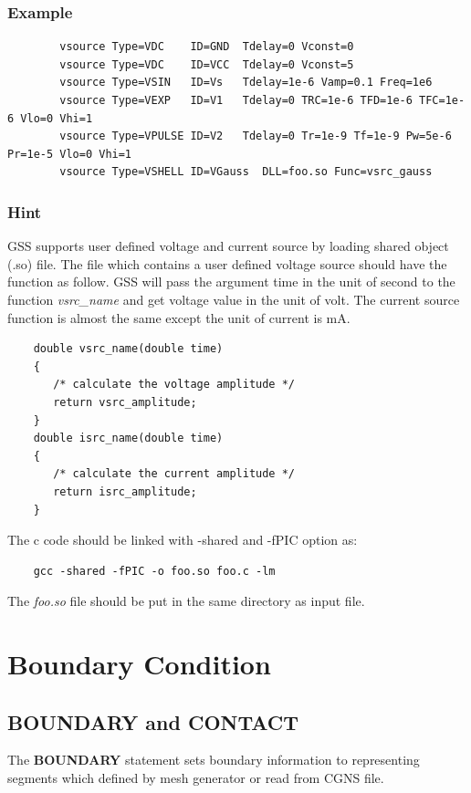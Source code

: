 \documentclass[11pt,pdftex]{article}
\begin{document}
\subsubsection*{Example}
\begin{verbatim}
        vsource Type=VDC    ID=GND  Tdelay=0 Vconst=0
        vsource Type=VDC    ID=VCC  Tdelay=0 Vconst=5
        vsource Type=VSIN   ID=Vs   Tdelay=1e-6 Vamp=0.1 Freq=1e6
        vsource Type=VEXP   ID=V1   Tdelay=0 TRC=1e-6 TFD=1e-6 TFC=1e-6 Vlo=0 Vhi=1
        vsource Type=VPULSE ID=V2   Tdelay=0 Tr=1e-9 Tf=1e-9 Pw=5e-6 Pr=1e-5 Vlo=0 Vhi=1
        vsource Type=VSHELL ID=VGauss  DLL=foo.so Func=vsrc_gauss
\end{verbatim}

\newpage
\subsubsection*{Hint}
GSS supports user defined voltage and current source by loading
shared object (.so) file. The file which contains a user defined
voltage source should have the function as follow. GSS will pass the
argument time in the unit of second to the function
\textit{vsrc\_name} and get voltage value in the unit of volt. The
current source function is almost the same except the unit of
current is $\mathrm{mA}$.

\begin{verbatim}
    double vsrc_name(double time)
    {
       /* calculate the voltage amplitude */
       return vsrc_amplitude;
    }
    double isrc_name(double time)
    {
       /* calculate the current amplitude */
       return isrc_amplitude;
    }
\end{verbatim}

The c code should be linked with -shared and -fPIC option as:
\begin{verbatim}
    gcc -shared -fPIC -o foo.so foo.c -lm
\end{verbatim}

The \textit{foo.so} file should be put in the same directory as
input file.

\newpage
\section{Boundary Condition}

\subsection{BOUNDARY and CONTACT}
The \textbf{BOUNDARY} statement sets boundary information to
representing segments which defined by mesh generator or read from
CGNS file.
\end{document}
